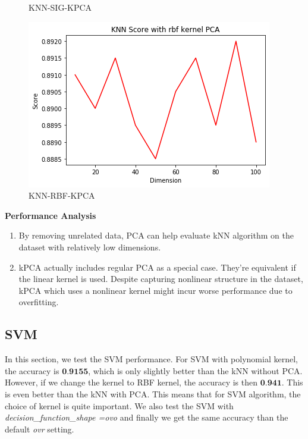 \documentclass[12pt]{article}
\begin{document}
\begin{figure}[htpb]
\begin{minipage}{0.3\textwidth}
		\caption{KNN-SIG-KPCA}
		\label{fig:KNN-SIG-KPCA}
	\end{minipage}
	\begin{minipage}{0.3\textwidth}
		\centering
		\includegraphics[width=\linewidth]{./exp-figs/KNN-RBF-KPCA.png}
		\caption{KNN-RBF-KPCA}
		\label{fig:KNN-RBF-KPCA}
	\end{minipage}
\end{figure}

\textbf{Performance Analysis} 

\begin{enumerate}[label=(\roman*)]
	\item By removing unrelated data, PCA can help evaluate kNN algorithm on the dataset with relatively low dimensions. 
	\item kPCA actually includes regular PCA as a special case. They're equivalent if the linear kernel is used. Despite capturing nonlinear structure in the dataset, kPCA which uses a nonlinear kernel might incur worse performance due to overfitting.
\end{enumerate}


\subsection{SVM}
In this section, we test the SVM performance. For SVM with polynomial kernel, the accuracy is $\textbf{0.9155}$, which is only slightly better than the kNN without PCA. However, if we change the kernel to RBF kernel, the accuracy is then $\textbf{0.941}$. This is even better than the kNN with PCA. This means that for SVM algorithm, the choice of kernel is quite important. We also test the SVM with \emph{decision\_function\_shape =ovo} and finally we get the same accuracy than the default \emph{ovr} setting.
\end{document}
